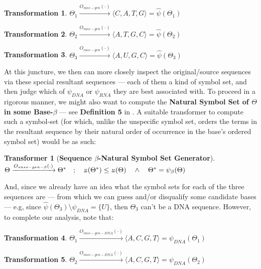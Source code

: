 \documentclass[a4paper, 18pt]{book} %
\newtheorem{trans}{Transformation}
\newtheorem{transf}{Transformer}
\newcommand{\invpi}{\rotatebox[origin=c]{180}{$\pi$}}
\begin{document}
\begin{trans}
$\Theta_1 \xrightarrow{O_{suss-gen}(\cdot)} \langle C, A, T, G \rangle = \hat{\psi}(\Theta_1)$
\end{trans}

\begin{trans}
$\Theta_2 \xrightarrow{O_{suss-gen}(\cdot)} \langle A, T, G, C \rangle = \hat{\psi}(\Theta_2)$
\end{trans}

\begin{trans}
$\Theta_3 \xrightarrow{O_{suss-gen}(\cdot)} \langle A, U, G, C \rangle = \hat{\psi}(\Theta_3)$\\
\end{trans}

At this juncture, we then can more closely inspect the original/source sequences via these special resultant sequences --- each of them a kind of symbol set, and then judge which of $\psi_{DNA}$ or $\psi_{RNA}$ they are best associated with. To proceed in a rigorous manner, we might also want to compute the \textbf{Natural Symbol Set of $\Theta$ in some Base-$\beta$} --- see \textbf{Definition 5} in \cite{ossipaper}. A suitable transformer to compute such a symbol-set (for which, unlike the unspecific symbol set, orders the terms in the resultant sequence by their natural order of occurrence in the base's ordered symbol set) would be as such:\\


\begin{transf}[\textbf{Sequence $\beta$-Natural Symbol Set Generator}]
\label{TRANSNSGEN}$ $\\
$\Theta \xrightarrow{O_{snss-gen-\beta}(\cdot)} \Theta^* \quad;\quad \invpi(\Theta^*) \leq \invpi(\Theta) \quad \land \quad \Theta^* = \psi_\beta(\Theta)$\\
\end{transf}

And, since we already have an idea what the symbol sets for each of the three sequences are --- from which we can guess and/or disqualify some candidate bases --- e.g, since $\hat{\psi}(\Theta_3) \setminus \psi_{DNA} = \{U\}$, then $\Theta_3$ can't be a DNA sequence. However, to complete our analysis, note that:


\begin{trans}
$\Theta_1 \xrightarrow{O_{snss-gen-DNA}(\cdot)} \langle A, C, G, T \rangle = \psi_{DNA}(\Theta_1)$
\end{trans}

\begin{trans}
$\Theta_2 \xrightarrow{O_{snss-gen-DNA}(\cdot)} \langle A, C, G, T \rangle = \psi_{DNA}(\Theta_2)$
\end{trans}
\end{document}
